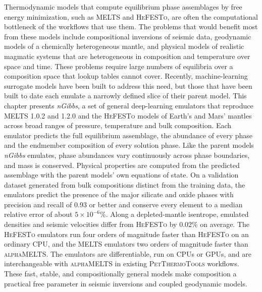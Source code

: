 Thermodynamic models that compute equilibrium phase assemblages by free energy minimization, such as \textsc{MELTS} and
\textsc{HeFESTo}, are often the computational bottleneck of the workflows that use them. The problems that would benefit most from
these models include compositional inversions of seismic data, geodynamic models of a chemically heterogeneous mantle, and
physical models of realistic magmatic systems that are heterogeneous in composition and temperature over space and time. These problems 
require large numbers of equilibria over a composition space that lookup tables cannot cover. Recently, machine-learning surrogate models have 
been built to address this need, but those that have been built to date each emulate a narrowly defined slice of their parent model. This chapter presents
\emph{nGibbs}, a set of general deep-learning emulators that reproduce \textsc{MELTS} 1.0.2 and 1.2.0 and the \textsc{HeFESTo} models of
Earth's and Mars' mantles across broad ranges of pressure, temperature and bulk composition. Each emulator predicts the full
equilibrium assemblage, the abundance of every phase and the endmember composition of every solution phase. Like the parent models
\emph{nGibbs} emulates, phase abundances vary continuously across phase boundaries, and mass is conserved. Physical properties are computed from the
predicted assemblage with the parent models' own equations of state. On a validation dataset generated from bulk compositions distinct from the training data,
the emulators predict the presence of the major silicate and oxide phases with precision and recall of 0.93 or better and conserve every element to a median relative error of about
$5\times10^{-6}\%$. Along a depleted-mantle isentrope, emulated densities and seismic velocities differ from \textsc{HeFESTo} by
0.02\% on average. The \textsc{HeFESTo} emulators run four orders of magnitude faster than \textsc{HeFESTo} on an ordinary
CPU, and the \textsc{MELTS} emulators two orders of magnitude faster than \textsc{alphaMELTS}. The emulators are
differentiable, run on CPUs or GPUs, and are interchangeable with \textsc{alphaMELTS} in existing \textsc{PetThermoTools} workflows. These fast, stable, and compositionally
general models make composition a practical free parameter in seismic inversions and coupled geodynamic models.
